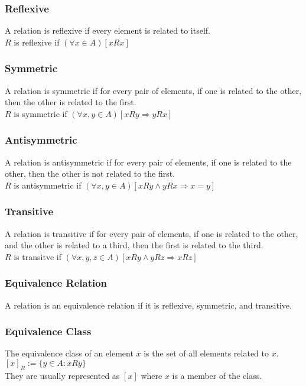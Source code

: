 \documentclass{article}
\begin{document}
\subsubsection*{Reflexive}
A relation is reflexive if every element is related to itself.\\
$R$ is reflexive if $(\forall x \in A)[xRx]$
\subsubsection*{Symmetric}
A relation is symmetric if for every pair of elements, if one is related to the other, then the other is related to the first.\\
$R$ is symmetric if $(\forall x,y \in A)[xRy \Rightarrow yRx]$
\subsubsection*{Antisymmetric}
A relation is antisymmetric if for every pair of elements, if one is related to the other, then the other is not related to the first.\\
$R$ is antisymmetric if $(\forall x,y \in A)[xRy \wedge yRx \Rightarrow x = y]$
\subsubsection*{Transitive}
A relation is transitive if for every pair of elements, if one is related to the other, and the other is related to a third, then the first is related to the third.\\
$R$ is transitve if $(\forall x,y,z \in A)[xRy \wedge yRz \Rightarrow xRz]$
\subsubsection*{Equivalence Relation}
A relation is an equivalence relation if it is reflexive, symmetric, and transitive.\\
\subsubsection*{Equivalence Class}
The equivalence class of an element $x$ is the set of all elements related to $x$.\\
$[x]_R := \{y \in A : xRy\}$\\
They are usually represented as $[x]$ where $x$ is a member of the class.\\
\end{document}
